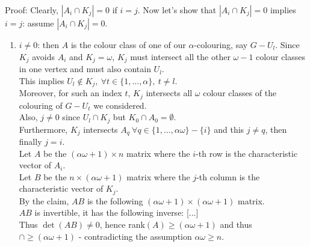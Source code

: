 \begin{enumerate}
\begin{itemize}
					Proof: Clearly, $|A_i \cap K_j| = 0$ if $i=j$. Now let's show that  $|A_i \cap K_j| = 0$ implies $i = j$: assume  $|A_i \cap K_j| = 0$.
						\begin{enumerate}
							\item $i \neq 0$: then $A$ is the colour class of one of our $\alpha$-colouring, say $G - U_l$.
								Since $K_j$ avoids $A_i$ and $K_j = \omega$, $K_j$ must intersect all the other $\omega - 1 $ colour classes in one vertex and must also contain $U_l$.\\
								
								This implies $U_l \notin K_j, ~\forall t \in \{1, ..., \alpha \}, ~t \neq l$.\\
								 
								Moreover, for such an index $t$, $K_j$ intersects all $\omega$ colour classes of the colouring of $G - U_t$ we considered.\\
								
								Also, $j \neq 0$ since $U_l \cap K_j$ but $K_0 \cap A_0 = \emptyset$.\\
								 
								Furthermore, $K_j$ intersects $A_q ~ \forall q \in \{1, ..., \alpha \omega \} - \{i \}$ and this $j \neq q$, then finally $j = i$.\\
								
								Let $A$ be the $(\alpha \omega + 1) \times n$ matrix where the $i$-th row is the characteristic vector of $A_i$.\\
								
								Let $B$ be the $n \times (\alpha \omega + 1)$ matrix where the $j$-th column is the characteristic vector of $K_j$.\\
								By the claim, $AB$ is the following $(\alpha \omega + 1) \times (\alpha \omega + 1)$ matrix.\\
								$AB$ is invertible, it has the following inverse: 
								[...] \\
								
								Thus $\det(AB) \neq 0$, hence rank$(A) \geq (\alpha \omega + 1)$ and thus $\cap \geq (\alpha \omega + 1)$ - contradicting the assumption $\alpha \omega \geq n$.
						\end{enumerate}
			\end{itemize}
	\end{enumerate}
	